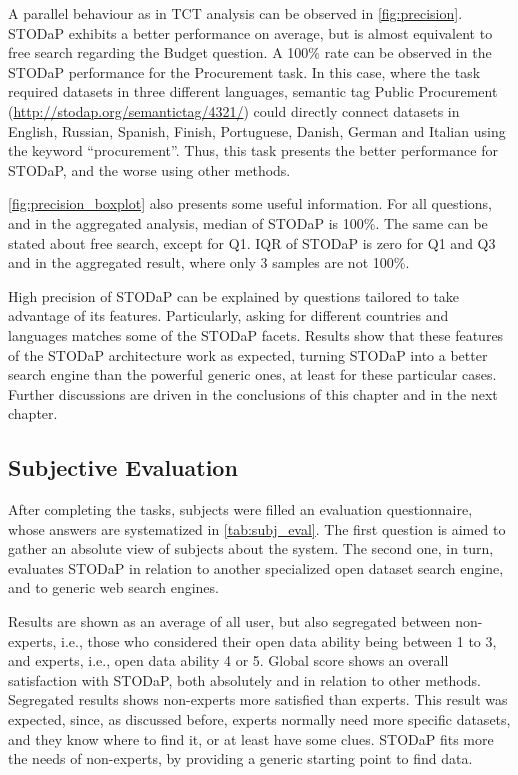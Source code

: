A parallel behaviour as in TCT analysis can be observed in \autoref{fig:precision}.
STODaP exhibits a better performance on average, but is almost equivalent to free search regarding the Budget question.
A 100\% rate can be observed in the STODaP performance for the Procurement task.
In this case, where the task required datasets in three different languages, semantic tag Public Procurement (\url{http://stodap.org/semantictag/4321/}) could directly connect datasets in English, Russian, Spanish, Finish, Portuguese, Danish, German and Italian using the keyword ``procurement''.
Thus, this task presents the better performance for STODaP, and the worse using other methods.

\autoref{fig:precision_boxplot} also presents some useful information.
For all questions, and in the aggregated analysis, median of STODaP is 100\%.
The same can be stated about free search, except for Q1.
IQR of STODaP is zero for Q1 and Q3 and in the aggregated result, where only 3 samples are not 100\%.

High precision of STODaP can be explained by questions tailored to take advantage of its features.
Particularly, asking for different countries and languages matches some of the STODaP facets.
Results show that these features of the STODaP architecture work as expected, turning STODaP into a better search engine than the powerful generic ones, at least for these particular cases.
Further discussions are driven in the conclusions of this chapter and in the next chapter.

\subsection{Subjective Evaluation}

After completing the tasks, subjects were filled an evaluation questionnaire, whose answers are systematized in \autoref{tab:subj_eval}.
The first question is aimed to gather an absolute view of subjects about the system.
The second one, in turn, evaluates STODaP in relation to another specialized open dataset search engine, and to generic web search engines.

Results are shown as an average of all user, but also segregated between non-experts, i.e., those who considered their open data ability being between 1 to 3, and experts, i.e., open data ability 4 or 5.
Global score shows an overall satisfaction with STODaP, both absolutely and in relation to other methods.
Segregated results shows non-experts more satisfied than experts.
This result was expected, since, as discussed before, experts normally need more specific datasets, and they know where to find it, or at least have some clues. 
STODaP fits more the needs of non-experts, by providing a generic starting point to find data.

